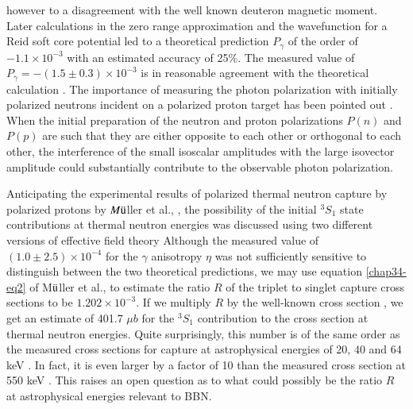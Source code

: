however to a disagreement with the well known deuteron magnetic moment. Later calculations \cite{chap34-key36} in the zero range approximation and the wavefunction for a Reid soft core potential led to a theoretical prediction $P_\gamma $ of the order of $-1.1 \times 10^{-3}$ with an estimated accuracy of 25$\%$. The measured value \cite{chap34-key37} of $P_\gamma =-(1.5 \pm 0.3)\times 10^{-3}$ is in reasonable agreement with the theoretical calculation \cite{chap34-key36}. The importance of measuring the photon polarization with initially polarized neutrons incident on a polarized proton target has been pointed out \cite{chap34-key38}. When the initial preparation of the neutron and proton polarizations $P(n)$ and $P(p)$ are such that they are either opposite to each other or orthogonal to each other, the interference of the small isoscalar amplitudes with the large isovector amplitude could substantially contribute to the observable photon polarization.

Anticipating the experimental results of polarized thermal neutron capture by polarized protons by $M\ddot{\rm u}$ller et al., \cite{chap34-key39}, the possibility of the initial $^3S_1$ state contributions at thermal neutron energies was discussed using two different versions of effective field theory \cite{chap34-key40,chap34-key41} Although the measured value of $(1.0\pm 2.5)\times 10^{-4}$ for the $\gamma$ anisotropy $\eta$ was not sufficiently sensitive to distinguish between the two theoretical predictions, we may use equation \eqref{chap34-eq2} of M$\ddot{\rm u}$ller et al., \cite{chap34-key39} to estimate the ratio $R$ of the triplet to singlet capture cross sections to be $1.202 \times 10^{-3} $. If we multiply $R$ by the well-known cross section  \cite{chap34-key22}, we get an estimate of 401.7 $\mu b$ for the $^3S_1$ contribution to the cross section at thermal neutron energies. Quite surprisingly, this number is of the same order as the measured cross sections for capture at astrophysical energies of 20, 40 and 64 keV \cite{chap34-key20}. In fact, it is even larger by a factor of 10 than the measured cross section at 550 keV \cite{chap34-key21}. This raises an open question as to what could possibly be the ratio $R$ at astrophysical energies relevant to BBN. 

